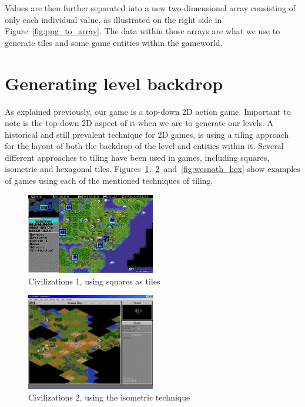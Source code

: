 Values are then further separated into a new two-dimensional array consisting
of only each individual value, as illustrated on the right side in
Figure~\ref{fig:png_to_array}.  The data within those arrays are what we use to
generate tiles and some game entities within the gameworld.

\section{Generating level backdrop}
As explained previously, our game is a top-down 2D action game. Important to
note is the top-down 2D aspect of it when we are to generate our levels.
A historical and still prevalent technique for 2D games, is using a
tiling approach for the layout of both the backdrop of the level and entities
within it. Several different approaches to tiling have been used in games,
including squares, isometric and hexagonal tiles.
Figures~\ref{fig:civ-1_square},~\ref{fig:civ-2_iso}~and~\ref{fig:wesnoth_hex}
show examples of games using each of the mentioned techniques of
tiling.

\begin{figure}[H]
    \centering
    \includegraphics[width=0.5\textwidth]{figures/generating_levels/civ-1_square.png}
    \caption{Civilizations 1, using squares as tiles}\label{fig:civ-1_square} 
\end{figure}

\begin{figure}[H]
    \centering
    \includegraphics[width=0.5\textwidth]{figures/generating_levels/civ-2_iso.png}
    \caption{Civilizations 2, using the isometric technique}\label{fig:civ-2_iso} 
\end{figure}

